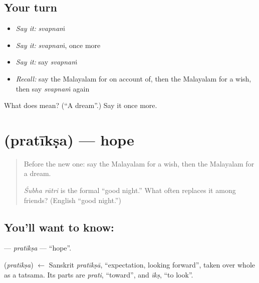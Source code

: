 \subsection*{Your turn}
\begin{itemize}
\raggedright
  \item \emph{Say it:} \emph{svapnaṁ}
  \item \emph{Say it:} \emph{svapnaṁ}, once more
  \item \emph{Say it:} say \emph{svapnaṁ}
  \item \emph{Recall:} say the Malayalam for on account of, then the Malayalam for a wish, then say \emph{svapnaṁ} again
\end{itemize}

\begin{tcolorbox}[breakable,colback=teal!4,colframe=teal!35!black,title={Before you move on}]
What does  mean? (\textquotedblleft{}A dream\textquotedblright{}.) Say it once more.
\end{tcolorbox}
\section[\texorpdfstring{\ml{പ്രതീക്ഷ} (pratīkṣa)}{പ്രതീക്ഷ (pratīkṣa)}]{ (pratīkṣa) — hope}

\label{lesson:ML-C145-pratiksa}



\begin{quote}
Before the new one: say the Malayalam for a wish, then the Malayalam for a dream.

\emph{Śubha rātri} is the formal \textquotedblleft{}good night.\textquotedblright{} What often replaces it among friends? (English \textquotedblleft{}good night.\textquotedblright{})
\end{quote}

\subsection*{You'll want to know: }
\textbf{} — \emph{pratīkṣa} — \textquotedblleft{}hope\textquotedblright{}.

\begin{cousinweb}
\textbf{} (\emph{pratīkṣa}) $\leftarrow$ Sanskrit \emph{pratīkṣā}, \textquotedblleft{}expectation, looking forward\textquotedblright{}, taken over whole as a tatsama. Its parts are \emph{prati}, \textquotedblleft{}toward\textquotedblright{}, and \emph{īkṣ}, \textquotedblleft{}to look\textquotedblright{}.
\end{cousinweb}

